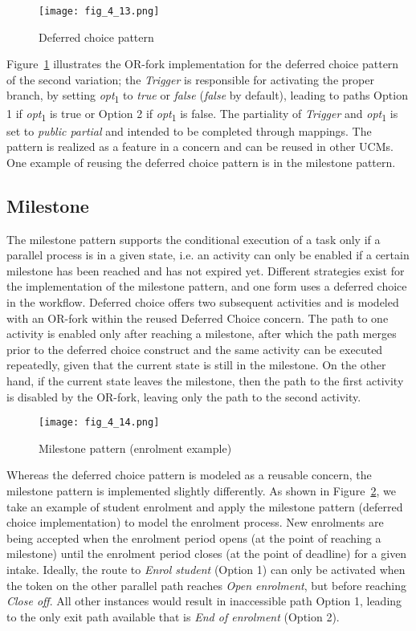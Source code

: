 \begin{figure}
	\centering
	\texttt{[image: fig\_4\_13.png]}
	\caption{Deferred choice pattern}
	\label{fig:4.13}
\end{figure}

Figure~\ref{fig:4.13} illustrates the OR-fork implementation for the deferred choice pattern of the second variation; the \emph{Trigger} is responsible for activating the proper branch, by setting \emph{opt}\textsubscript{1} to \emph{true} or \emph{false} (\emph{false} by default), leading to paths Option 1 if \emph{opt}\textsubscript{1} is true or Option 2 if \emph{opt}\textsubscript{1} is false. The partiality of \emph{Trigger} and \emph{opt}\textsubscript{1} is set to \emph{public partial} and intended to be completed through mappings. The pattern is realized as a feature in a concern and can be reused in other UCMs. One example of reusing the deferred choice pattern is in the milestone pattern.

\subsection{Milestone}

The milestone pattern supports the conditional execution of a task only if a parallel process is in a given state, i.e. an activity can only be enabled if a certain milestone has been reached and has not expired yet. Different strategies exist for the implementation of the milestone pattern, and one form uses a deferred choice in the workflow. Deferred choice offers two subsequent activities and is modeled with an OR-fork within the reused Deferred Choice concern. The path to one activity is enabled only after reaching a milestone, after which the path merges prior to the deferred choice construct and the same activity can be executed repeatedly, given that the current state is still in the milestone. On the other hand, if the current state leaves the milestone, then the path to the first activity is disabled by the OR-fork, leaving only the path to the second activity.

\begin{figure}
	\centering
	\texttt{[image: fig\_4\_14.png]}
	\caption{Milestone pattern (enrolment example)}
	\label{fig:4.14}
\end{figure}

Whereas the deferred choice pattern is modeled as a reusable concern, the milestone pattern is implemented slightly differently. As shown in Figure~\ref{fig:4.14}, we take an example of student enrolment and apply the milestone pattern (deferred choice implementation) to model the enrolment process. New enrolments are being accepted when the enrolment period opens (at the point of reaching a milestone) until the enrolment period closes (at the point of deadline) for a given intake. Ideally, the route to \emph{Enrol student} (Option 1) can only be activated when the token on the other parallel path reaches \emph{Open enrolment}, but before reaching \emph{Close off}. All other instances would result in inaccessible path Option 1, leading to the only exit path available that is \emph{End of enrolment} (Option 2).

